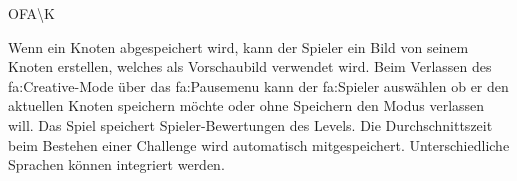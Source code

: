 \begin{ids}{\gls{OFA\K}}

	\id[ 480] Wenn ein Knoten abgespeichert wird, kann der Spieler ein Bild von seinem Knoten erstellen, welches als Vorschaubild verwendet wird.
	\id[ 490] Beim Verlassen des \gls{fa:Creative}-Mode über das \gls{fa:Pausemenu}  kann der \gls{fa:Spieler} auswählen ob er den aktuellen Knoten speichern möchte oder ohne Speichern den Modus verlassen will.
	\id[ 500] Das Spiel speichert Spieler-Bewertungen des Levels.
	\id[ 510] Die Durchschnittszeit beim Bestehen einer Challenge wird automatisch mitgespeichert.
	\id[ 520] Unterschiedliche Sprachen können integriert werden.
 	
 	
	
\end{ids}

~\\